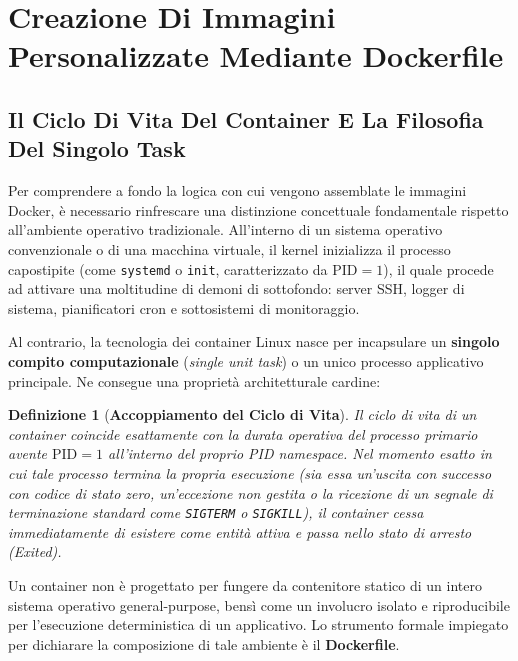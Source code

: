\documentclass[11pt, a4paper]{article}
\newtheorem{theorem}{Definizione}
\begin{document}


\section{Creazione Di Immagini Personalizzate Mediante Dockerfile}

\subsection{Il Ciclo Di Vita Del Container E La Filosofia Del Singolo Task}

Per comprendere a fondo la logica con cui vengono assemblate le immagini Docker, è necessario rinfrescare una distinzione concettuale fondamentale rispetto all'ambiente operativo tradizionale. All'interno di un sistema operativo convenzionale o di una macchina virtuale, il kernel inizializza il processo capostipite (come \texttt{systemd} o \texttt{init}, caratterizzato da $\text{PID} = 1$), il quale procede ad attivare una moltitudine di demoni di sottofondo: server SSH, logger di sistema, pianificatori cron e sottosistemi di monitoraggio.

Al contrario, la tecnologia dei container Linux nasce per incapsulare un \textbf{singolo compito computazionale} (\emph{single unit task}) o un unico processo applicativo principale. Ne consegue una proprietà architetturale cardine:
\begin{theorem}[\textbf{Accoppiamento del Ciclo di Vita}]
Il ciclo di vita di un container coincide esattamente con la durata operativa del processo primario avente $\text{PID} = 1$ all'interno del proprio PID namespace. Nel momento esatto in cui tale processo termina la propria esecuzione (sia essa un'uscita con successo con codice di stato zero, un'eccezione non gestita o la ricezione di un segnale di terminazione standard come \texttt{SIGTERM} o \texttt{SIGKILL}), il container cessa immediatamente di esistere come entità attiva e passa nello stato di arresto (\emph{Exited}).
\end{theorem}

Un container non è progettato per fungere da contenitore statico di un intero sistema operativo general-purpose, bensì come un involucro isolato e riproducibile per l'esecuzione deterministica di un applicativo. Lo strumento formale impiegato per dichiarare la composizione di tale ambiente è il \textbf{Dockerfile}.
\end{document}
